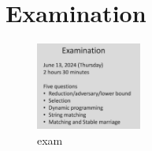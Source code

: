 \documentclass{source/Paper}
\begin{document}
    \tableofcontents
    
    
    
    
    
    
    
    
    
    

    \newpage
    \appendix
    \section{Examination}
    \begin{figure}[!htb]
        \centering
        \includegraphics[width=0.309\textwidth]{pic/exam.png}
        \caption{exam}
    \end{figure}
    
\end{document}
